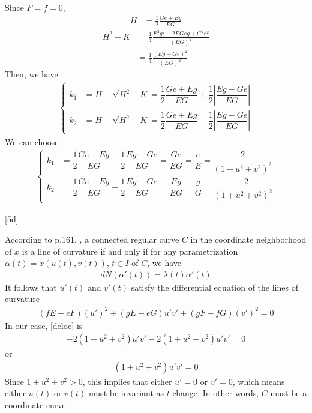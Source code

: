 \documentclass[a4paper]{report}
\begin{document}
Since $F = f = 0$,
\begin{align}
	H &= \frac{1}{2} \frac{Ge + Eg}{EG}
\end{align}
\begin{align}
	H^2 - K &= \frac{1}{4} \frac{E^2g^2 - 2EGeg + G^2e^2}{(EG)^2}\\
	&= \frac{1}{4} \frac{(Eg - Ge)^2}{(EG)^2}
\end{align}
Then, we have
\begin{align}
\begin{cases}
k_1 &= H + \sqrt{H^2 - K} = \dfrac{1}{2} \dfrac{Ge + Eg}{EG} + \dfrac{1}{2} \left \lvert\dfrac{Eg - Ge}{EG}\right\rvert\\
k_2 &= H - \sqrt{H^2 - K} =\dfrac{1}{2} \dfrac{Ge + Eg}{EG} - \dfrac{1}{2} \left \lvert\dfrac{Eg - Ge}{EG}\right\rvert
\end{cases}
\end{align}
We can choose
\begin{align}
\begin{cases}
k_1 &= \dfrac{1}{2} \dfrac{Ge + Eg}{EG} - \dfrac{1}{2}\dfrac{Eg - Ge}{EG} = \dfrac{Ge}{EG} = \dfrac{e}{E} = \dfrac{2}{(1 + u^2 + v^2)^2}\\
k_2 &= \dfrac{1}{2} \dfrac{Ge + Eg}{EG} + \dfrac{1}{2}\dfrac{Eg - Ge}{EG} = \dfrac{Eg}{EG} = \dfrac{g}{G} = \dfrac{-2}{(1 + u^2 + v^2)^2}
\end{cases}
\end{align}

\newpage
\ref{5d}

According to p.161, \cite{2}, a connected regular curve $C$ in the coordinate neighborhood of $x$ is a line of curvature if and only if for any parametrization $\alpha(t) = x(u(t), v(t))$, $t \in I$ of $C$, we have
\begin{align}
	dN(\alpha'(t)) = \lambda(t) \alpha'(t)
\end{align}
It follows that $u'(t)$ and $v'(t)$ satisfy the differential equation of the lines of curvature
\begin{align}
	\label{deloc}
	(fE − eF)(u′)^2 + (gE − eG)u′v′ + (gF − fG)(v′)^2 = 0
\end{align}
In our case, \eqref{deloc} is
\begin{align}
	-2(1+u^2+v^2)u'v' - 2(1+u^2+v^2)u'v' =0
\end{align}
or
\begin{align}
	\label{deloc_1}
	(1+u^2+v^2)u'v' =0
\end{align}
Since $1+u^2+v^2 > 0$, this implies that either $u' = 0$ or $v' = 0$, which means either $u(t)$ or $v(t)$ must be invariant as $t$ change. In other words, $C$ must be a coordinate curve.
\end{document}

